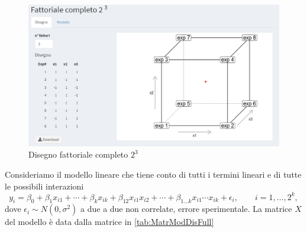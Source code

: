 \documentclass[
]{book}
\begin{document}
\begin{figure}

{\centering \includegraphics[width=1\linewidth]{Immagini/02_fattacompl3liv} 

}

\caption{Disegno fattoriale completo $2^3$\label{fig2}}\label{fig:unnamed-chunk-4}
\end{figure}

Consideriamo il modello lineare che tiene conto di tutti i termini lineari e di tutte le possibili interazioni
\begin{equation}\label{eq:ModDisFull}
     y_i=\beta_0+\beta_1x_{i1}+\cdots+\beta_kx_{ik}+\beta_{12}x_{i1}x_{i2}+\cdots+\beta_{1\dots k}x_{i1} \cdots x_{ik}+\epsilon_i, \qquad i=1,\dots,2^k,
\end{equation}
dove \(\epsilon_i\sim N(0,\sigma^2)\) a due a due non correlate, errore sperimentale.\newline
La matrice \(X\) del modello è data dalla matrice in \autoref{tab:MatrModDisFull}
\end{document}
